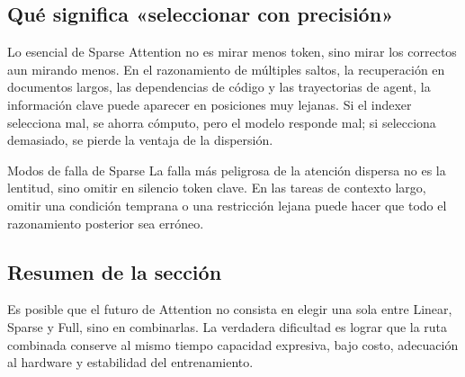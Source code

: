 \subsection{Qué significa «seleccionar con precisión»}

Lo esencial de Sparse Attention no es mirar menos token, sino mirar los correctos aun mirando menos. En el razonamiento de múltiples saltos, la recuperación en documentos largos, las dependencias de código y las trayectorias de agent, la información clave puede aparecer en posiciones muy lejanas. Si el indexer selecciona mal, se ahorra cómputo, pero el modelo responde mal; si selecciona demasiado, se pierde la ventaja de la dispersión.

\begin{warningbox}{Modos de falla de Sparse}
La falla más peligrosa de la atención dispersa no es la lentitud, sino omitir en silencio token clave. En las tareas de contexto largo, omitir una condición temprana o una restricción lejana puede hacer que todo el razonamiento posterior sea erróneo.
\end{warningbox}

\subsection{Resumen de la sección}

Es posible que el futuro de Attention no consista en elegir una sola entre Linear, Sparse y Full, sino en combinarlas. La verdadera dificultad es lograr que la ruta combinada conserve al mismo tiempo capacidad expresiva, bajo costo, adecuación al hardware y estabilidad del entrenamiento.
